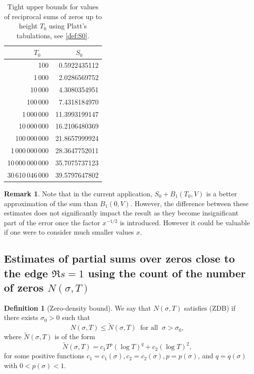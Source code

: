 \documentclass[10pt]{amsart}
\newcommand{\s}{\sigma}
\theoremstyle{definition}
\newtheorem*{defn*}{Definition}
\newtheorem{Rem}[prop]{Remark}
\numberwithin{equation}{section}
\begin{document}
\begin{table}[h]
\caption{Tight upper bounds for values of reciprocal sums of zeros up to height $T_0$ using Platt's tabulations, see \eqref{def:S0}.}\label{tab:Sig1}
\begin{tabular}{|r|r|}
\hline
$T_0$\ \qquad\ 	&$S_0$\ \qquad\ \ \qquad\ \\
\hline
100&	0.5922435112\\
1\,000&	2.0286569752\\
10\,000	&4.3080354951\\
100\,000&	7.4318184970\\
1\,000\,000&	11.3993199147\\
10\,000\,000&	16.2106480369\\
100\,000\,000&	21.8657999924\\
1\,000\,000\,000&	28.3647752011\\
10\,000\,000\,000&	35.7075737123\\
30\,610\,046\,000&	39.5797647802\\
\hline\end{tabular}
\end{table}

\begin{Rem}
Note that in the current application, $S_0 + B_1(T_0,V)$ is a better approximation of the sum than $B_1(0,V)$. However, the difference between these estimates does not significantly impact the result as they become insignificant part of the error once the factor $x^{-1/2}$ is introduced.
However it could be valuable if one were to consider much smaller values $x$.
\end{Rem}


\subsection{Estimates of partial sums over zeros close to the edge $\Re s=1$ using the count of the number of zeros $N(\s,T)$}
\label{section-N(s,T)}

\begin{defn*}[Zero-density bound]\label{ZDB}
We say that $N(\s,T)$ satisfies (ZDB) if there exists $ \s_0>0$ such that
\begin{equation}\label{bnd-ZDB}
 N(\s,T) \le  \tilde{N}(\s,T) \ \text{ for all }\  \s >\s_0 ,
 \end{equation}
where $ \tilde{N}(\s,T) $ is of the form
\begin{equation}\label{def-Ntilde}
 \tilde{N}(\s,T) = c_1 T^{p} (\log T )^{q} + c_2(\log T)^2,
  \end{equation}
for some positive functions $c_1=c_1(\s), c_2=c_2(\s), p=p(\s)$, and $q=q(\s)$ with $0<p(\s)<1$.
\end{defn*}
\end{document}
